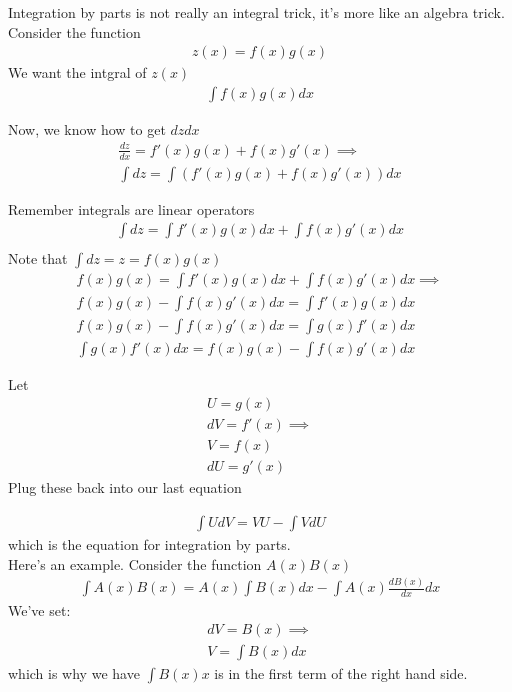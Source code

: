 \documentclass{article}
\begin{document}
Integration by parts is not really an integral trick, it's more like an algebra trick. \\

Consider the function 
\begin{align}
    z(x) = f(x) g(x)
\end{align}
We want the intgral of $z(x)$ 
\begin{align}
    \int f(x)g(x) dx 
\end{align}

Now, we know how to get $dz dx$
\begin{align}
    \frac{dz}{dx} = f'(x) g(x) + f(x) g'(x) \implies\\
    \int dz = \int (f'(x) g(x) + f(x) g'(x)) dx 
\end{align}

Remember integrals are linear operators
\begin{align}
    \int dz = \int f'(x) g(x) dx + \int f(x) g'(x) dx\\
\end{align}
Note that $\int dz = z = f(x) g(x)$
\begin{align}
    f(x) g(x) = \int f'(x) g(x) dx + \int f(x) g'(x) dx \implies \\
    f(x) g(x) - \int f(x) g'(x) dx = \int f'(x) g(x) dx \\
    f(x) g(x) - \int f(x) g'(x) dx = \int g(x) f'(x) dx  \\
    \int g(x) f'(x) dx = f(x) g(x) - \int f(x) g'(x) dx
\end{align}

Let 
\begin{align}
    U = g(x) \\
    dV = f'(x) \implies \\
    V = f(x) \\
    dU = g'(x)
\end{align}
Plug these back into our last equation 

\begin{align}
    \int U dV = V U - \int V dU
\end{align}
which is the equation for integration by parts. \\

Here's an example. Consider the function $A(x)B(x)$ 
\begin{align}
    \int A(x) B(x) = A(x) \int B(x) dx - \int A(x) \frac{d B(x)}{dx} dx
\end{align}
We've set: 
\begin{align}
    dV = B(x) \implies\\
    V = \int B(x) dx
\end{align}
which is why we have $\int B(x) x$ is in the first term of the right hand side.
\end{document}
